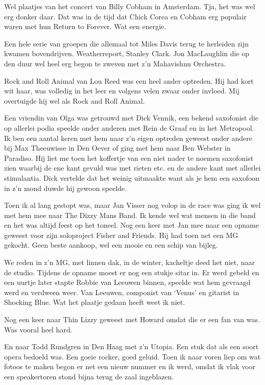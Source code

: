 \documentclass[10pt,twoside,openright]{memoir}
\begin{document}
Wel plaatjes van het concert van Billy Cobham in Amsterdam. Tja, het was wel erg donker daar. Dat was in de tijd dat Chick Corea en Cobham erg populair waren met hun Return to Forever. Wat een energie. 

Een hele serie van groepen die allemaal tot Miles Davis terug te herleiden zijn kwamen bovendrijven. Weatherreport, Stanley Clark. Jon MacLaughlin die op den duur wel heel erg begon te zweven met z’n Mahavishnu Orchestra.

Rock and Roll Animal van Lou Reed was een heel ander optreden. Hij had kort wit haar, was volledig in het leer en volgens velen zwaar onder invloed. Mij overtuigde hij wel als Rock and Roll Animal.

Een vriendin van Olga was getrouwd met Dick Vennik, een bekend saxofonist die op allerlei podia speelde onder anderen met Rein de Graaf en in het Metropool. Ik ben een aantal keren met hem naar z’n eigen optreden geweest onder andere bij Max Theeuwisse in Den Oever of ging met hem naar Ben Webster in Paradiso. Hij liet me toen het koffertje van een niet nader te noemen saxofonist zien waarbij de ene kant gevuld was met rieten etc. en de andere kant met allerlei stimulantia. Dick vertelde dat het weinig uitmaakte want als je hem een saxofoon in z’n mond duwde hij gewoon speelde.

Toen ik al lang gestopt was, maar Jan Visser nog volop in de race was ging ik wel met hem mee naar The Dizzy Mans Band. Ik kende wel wat mensen in die band en het was altijd feest op het toneel. Nog een keer met Jan mee naar een opname geweest voor zijn soloproject Fisher and Friends. Hij had toen net een MG gekocht. Geen beste aankoop, wel een mooie en een schip van bijleg. 

We reden in z’n MG, met linnen dak, in de winter, kacheltje deed het niet, naar de studio. Tijdens de opname moest er nog een stukje sitar in. Er werd gebeld en een uurtje later stapte Robbie van Leeuwen binnen, speelde wat hem gevraagd werd en verdween weer. Van Leeuwen, componist van ‘Venus’ en gitarist in Shocking Blue. Wat het plaatje gedaan heeft weet ik niet.

Nog een keer naar Thin Lizzy geweest met Howard omdat die er een fan van was. Was vooral heel hard. 

En naar Todd Rundgren in Den Haag met z’n Utopia. Een stuk dat als een soort opera bedoeld was. Een goeie rocker, goed geluid. Toen ik naar voren liep om wat fotoos te maken begon er net een nieuw nummer en ik werd, omdat ik vlak voor een speakertoren stond bijna terug de zaal ingeblazen.
\end{document}
